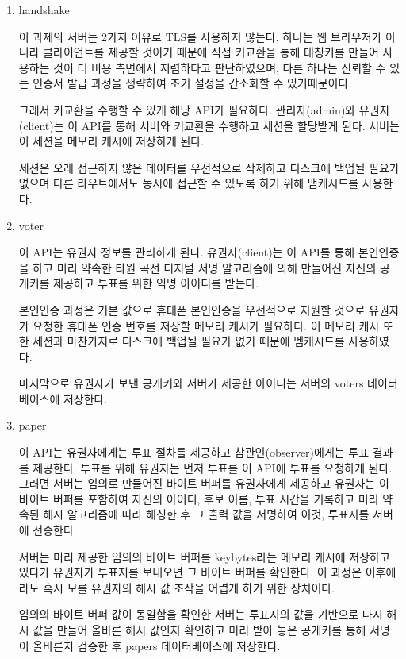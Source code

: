\documentclass[8pt,a4paper,left=8mm,right=8mm,top=10mm,bottom=10mm]{article}
\begin{document}
\begin{enumerate}
    \item handshake
    
    이 과제의 서버는 2가지 이유로 TLS를 사용하지 않는다. 하나는 웹 브라우저가 아니라 클라이언트를 제공할 것이기 때문에 직접 키교환을 통해 대칭키를 만들어 사용하는 것이 더 비용 측면에서 저렴하다고 판단하였으며, 다른 하나는 신뢰할 수 있는 인증서 발급 과정을 생략하여 초기 설정을 간소화할 수 있기때문이다.

    그래서 키교환을 수행할 수 있게 해당 API가 필요하다. 관리자(admin)와 유권자(client)는 이 API를 통해 서버와 키교환을 수행하고 세션을 할당받게 된다. 서버는 이 세션을 메모리 캐시에 저장하게 된다.
    
    세션은 오래 접근하지 않은 데이터를 우선적으로 삭제하고 디스크에 백업될 필요가 없으며 다른 라우트에서도 동시에 접근할 수 있도록 하기 위해 맴캐시드를 사용한다.

    \item voter
    
    이 API는 유권자 정보를 관리하게 된다. 유권자(client)는 이 API를 통해 본인인증을 하고 미리 약속한 타원 곡선 디지털 서명 알고리즘에 의해 만들어진 자신의 공개키를 제공하고 투표를 위한 익명 아이디를 받는다.

    본인인증 과정은 기본 값으로 휴대폰 본인인증을 우선적으로 지원할 것으로 유권자가 요청한 휴대폰 인증 번호를 저장할 메모리 캐시가 필요하다. 이 메모리 캐시 또한 세션과 마찬가지로 디스크에 백업될 필요가 없기 때문에 멤캐시드를 사용하였다.

    마지막으로 유권자가 보낸 공개키와 서버가 제공한 아이디는 서버의 voters 데이터베이스에 저장한다.

    \item paper
    
    이 API는 유권자에게는 투표 절차를 제공하고 참관인(observer)에게는 투표 결과를 제공한다. 투표를 위해 유권자는 먼저 투표를 이 API에 투표를 요청하게 된다. 그러면 서버는 임의로 만들어진 바이트 버퍼를 유권자에게 제공하고 유권자는 이 바이트 버퍼를 포함하여 자신의 아이디, 후보 이름, 투표 시간을 기록하고 미리 약속된 해시 알고리즘에 따라 해싱한 후 그 출력 값을 서명하여 이것, 투표지를 서버에 전송한다.

    서버는 미리 제공한 임의의 바이트 버퍼를 keybytes라는 메모리 캐시에 저장하고 있다가 유권자가 투표지를 보내오면 그 바이트 버퍼를 확인한다. 이 과정은 이후에라도 혹시 모를 유권자의 해시 값 조작을 어렵게 하기 위한 장치이다.

    임의의 바이트 버퍼 값이 동일함을 확인한 서버는 투표지의 값을 기반으로 다시 해시 값을 만들어 올바른 해시 값인지 확인하고 미리 받아 놓은 공개키를 통해 서명이 올바른지 검증한 후 papers 데이터베이스에 저장한다.


\end{enumerate}
\end{document}
